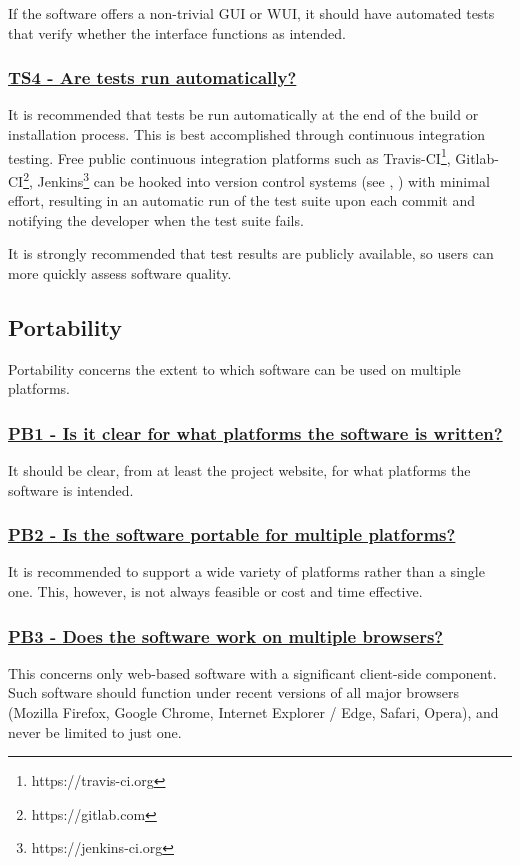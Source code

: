\documentclass[a4paper,11pt]{article}
\newcommand{\criterion}[2]{\subsubsection*{\underline{#1 - #2}}\label{id:#1}}
\newcommand\CheckTable{%
  \begin{tabular}{ccccc}
    No & Minimal & Adequate & Good & Perfect \\
    0 & 1 & 2 & 3 & 4 \\
    \hline
    $\square$ & $\square$ & $\square$ & $\square$ & $\square$ \\
  \end{tabular}%
}
\newcommand{\refcrit}[1]{%
 \framebox[1.1\width]{\hyperref[id:#1]{#1}}
}
\begin{document}
If the software offers a non-trivial GUI or WUI, it should have automated tests
that verify whether the interface functions as intended.


\newcommand{\tsFourID}{TS4}
\newcommand{\tsFourText}{Are tests run automatically?}
\criterion{\tsFourID}{\tsFourText}

It is recommended that tests be run automatically at the end of the build
or installation process. This is best accomplished through continuous
integration testing. Free public continuous integration
platforms such as Travis-CI\footnote{https://travis-ci.org},
Gitlab-CI\footnote{https://gitlab.com},
Jenkins\footnote{https://jenkins-ci.org} can be hooked into version control
systems (see \refcrit{AC1}, \refcrit{AC2}) with minimal effort, resulting in an
automatic run of the test suite upon each commit and notifying the developer
when the test suite fails.

It is strongly recommended that test results are publicly available, so users
can more quickly assess software quality.

\subsection{Portability}\label{sec:por}

Portability concerns the extent to which software can be used on multiple
platforms. 

\newcommand{\pbOneID}{PB1}
\newcommand{\pbOneText}{Is it clear for what platforms the software is written?}
\criterion{\pbOneID}{\pbOneText}

It should be clear, from at least the project website, for what platforms the software
is intended.


\newcommand{\pbTwoID}{PB2}
\newcommand{\pbTwoText}{Is the software portable for multiple platforms?}
\criterion{\pbTwoID}{\pbTwoText}

It is recommended to support a wide variety of platforms rather than a single
one. This, however, is not always feasible or cost and time effective.


\newcommand{\pbThreeID}{PB3}
\newcommand{\pbThreeText}{Does the software work on multiple browsers?}
\criterion{\pbThreeID}{\pbThreeText}

This concerns only web-based software with a significant client-side component.
Such software should function under recent versions of all major browsers
(Mozilla Firefox, Google Chrome, Internet Explorer / Edge, Safari, Opera), and
never be limited to just one.
\end{document}
